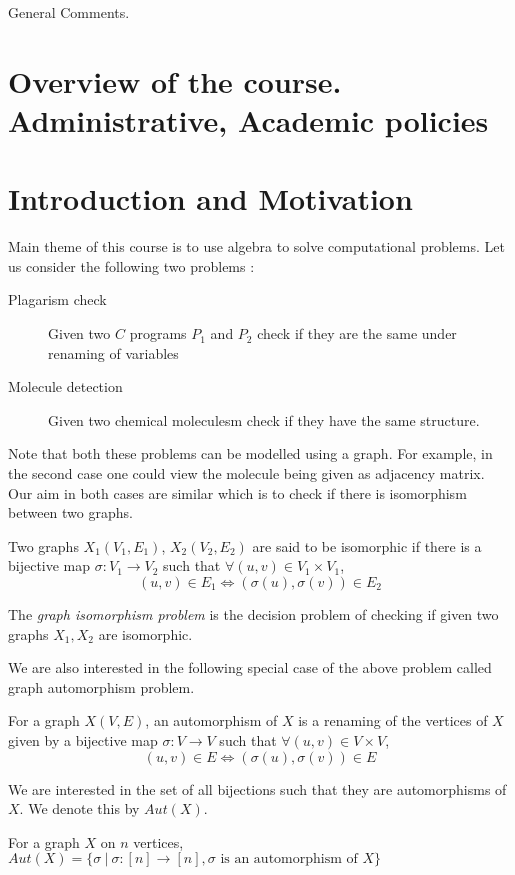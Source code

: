 
\noindent
General Comments.

\section{Overview of the course. Administrative, Academic policies}
\newpage

\section{Introduction and Motivation}
Main theme of this course is to use algebra to solve computational problems.
Let us consider the following two problems :
\begin{description}
	\item [Plagarism check]
	Given two $C$ programs $P_1$ and $P_2$ check if they are the same
	under renaming of variables
	\item [Molecule detection]
	Given two chemical moleculesm check if they have the same structure.
\end{description}

Note that both these problems can be modelled using a graph. For example, in
the second case one could view the molecule being given as adjacency matrix.
Our aim in both cases are similar which is to check if there is isomorphism
between two graphs.

\begin{definition}
	Two graphs $X_1(V_1,E_1)$, $X_2(V_2,E_2)$ are said to be isomorphic if
	there is a bijective map $\sigma:V_1 \to V_2$ such that $\forall
	(u,v) \in V_1 \times V_1$, \[(u,v) \in E_1 \iff (\sigma(u), \sigma(v))
	\in E_2 \]
\end{definition}
\begin{problem}
	The \emph{graph isomorphism problem} is the decision problem of
	checking if given two graphs $X_1, X_2$ are isomorphic.
\end{problem}

We are also interested in the following special case of the above problem
called graph automorphism problem. 

\begin{definition}
	For a graph $X(V,E)$, an automorphism of $X$ is a renaming of the
	vertices of $X$ given by a bijective map $\sigma:V \to V$ such 
	that $\forall
	(u,v) \in V \times V$, \[(u,v) \in E \iff (\sigma(u), \sigma(v))
	\in E \]
\end{definition}
We are interested in the set of all bijections such that they are
automorphisms of $X$. We denote this by $Aut(X)$.
\begin{definition}
	For a graph $X$ on $n$ vertices, 
	$Aut(X) = \{ \sigma ~|~ \sigma :[n] \to [n], \sigma \text{ is an
	automorphism of }X \}$
\end{definition}

